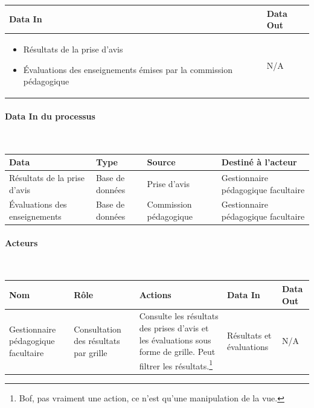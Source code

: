 \documentclass[a4paper,11pt]{report}
\begin{document}
\begin{tabularx}{\linewidth}{|X|X|} \hline
Data In & Data Out \\ \hline
\begin{itemize}
	\item Résultats de la prise d'avis
	\item Évaluations des enseignements émises par la commission pédagogique \newline{}
\end{itemize}
& N/A \\ \hline
\end{tabularx}

\paragraph{Data In du processus}~\newline{}

\begin{tabularx}{\linewidth}{|X|X|X|X|} \hline
Data & Type & Source & Destiné à l'acteur \\ \hline
Résultats de la prise d'avis & Base de données & Prise d'avis & Gestionnaire pédagogique facultaire \\
Évaluations des enseignements & Base de données & Commission pédagogique & Gestionnaire pédagogique facultaire \\ \hline
\end{tabularx}



\paragraph{Acteurs}~\newline{}

\begin{tabularx}{\linewidth}{|X|X|X|X|X|} \hline
Nom & Rôle & Actions & Data In & Data Out \\ \hline 
Gestionnaire pédagogique facultaire & Consultation des résultats par grille & Consulte les résultats des prises d'avis et les évaluations sous forme de grille. Peut filtrer les résultats.\footnote{Bof, pas vraiment une action, ce n'est qu'une manipulation de la vue.} & Résultats et évaluations & N/A \\ \hline
\end{tabularx}
\end{document}
